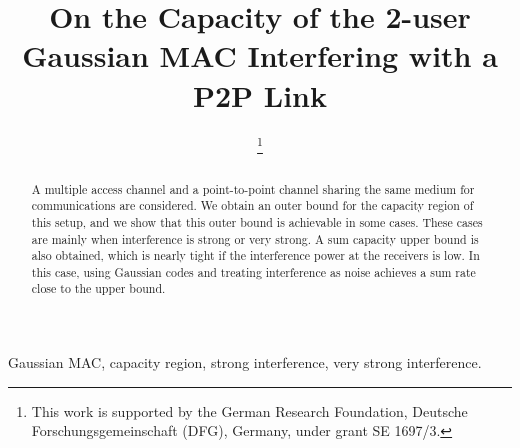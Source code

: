 \documentclass[10pt,conference]{IEEEtran}
\begin{document}



\IEEEoverridecommandlockouts
\title{On the Capacity of the 2-user Gaussian MAC Interfering with a P2P Link}
\author{
\thanks{%
This work is supported by the German Research Foundation, Deutsche
Forschungsgemeinschaft (DFG), Germany, under grant SE 1697/3.%
}
}

\maketitle


\begin{abstract}
A multiple access channel and a point-to-point channel sharing the same medium for communications are considered. We obtain an outer bound for the capacity region of this setup, and we show that this outer bound is achievable in some cases. These cases are mainly when interference is strong or very strong. A sum capacity upper bound is also obtained, which is nearly tight if the interference power at the receivers is low. In this case, using Gaussian codes and treating interference as noise achieves a sum rate close to the upper bound. 
\end{abstract}

\begin{IEEEkeywords}
Gaussian MAC, capacity region, strong interference, very strong interference. 
\end{IEEEkeywords}
\end{document}
